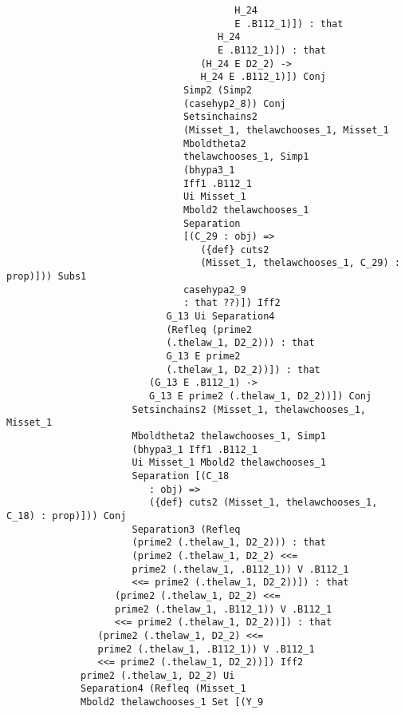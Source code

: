 \documentclass[12pt]{article}
\begin{document}
\begin{verbatim}
                                        H_24 
                                        E .B112_1)]) : that 
                                     H_24 
                                     E .B112_1)]) : that 
                                  (H_24 E D2_2) -> 
                                  H_24 E .B112_1)]) Conj 
                               Simp2 (Simp2 
                               (casehyp2_8)) Conj 
                               Setsinchains2 
                               (Misset_1, thelawchooses_1, Misset_1 
                               Mboldtheta2 
                               thelawchooses_1, Simp1 
                               (bhypa3_1 
                               Iff1 .B112_1 
                               Ui Misset_1 
                               Mbold2 thelawchooses_1 
                               Separation 
                               [(C_29 : obj) => 
                                  ({def} cuts2 
                                  (Misset_1, thelawchooses_1, C_29) : prop)])) Subs1 
                               casehypa2_9 
                               : that ??)]) Iff2 
                            G_13 Ui Separation4 
                            (Refleq (prime2 
                            (.thelaw_1, D2_2))) : that 
                            G_13 E prime2 
                            (.thelaw_1, D2_2))]) : that 
                         (G_13 E .B112_1) -> 
                         G_13 E prime2 (.thelaw_1, D2_2))]) Conj 
                      Setsinchains2 (Misset_1, thelawchooses_1, Misset_1 
                      Mboldtheta2 thelawchooses_1, Simp1 
                      (bhypa3_1 Iff1 .B112_1 
                      Ui Misset_1 Mbold2 thelawchooses_1 
                      Separation [(C_18 
                         : obj) => 
                         ({def} cuts2 (Misset_1, thelawchooses_1, C_18) : prop)])) Conj 
                      Separation3 (Refleq 
                      (prime2 (.thelaw_1, D2_2))) : that 
                      (prime2 (.thelaw_1, D2_2) <<= 
                      prime2 (.thelaw_1, .B112_1)) V .B112_1 
                      <<= prime2 (.thelaw_1, D2_2))]) : that 
                   (prime2 (.thelaw_1, D2_2) <<= 
                   prime2 (.thelaw_1, .B112_1)) V .B112_1 
                   <<= prime2 (.thelaw_1, D2_2))]) : that 
                (prime2 (.thelaw_1, D2_2) <<= 
                prime2 (.thelaw_1, .B112_1)) V .B112_1 
                <<= prime2 (.thelaw_1, D2_2))]) Iff2 
             prime2 (.thelaw_1, D2_2) Ui 
             Separation4 (Refleq (Misset_1 
             Mbold2 thelawchooses_1 Set [(Y_9 

\end{verbatim}
\end{document}
